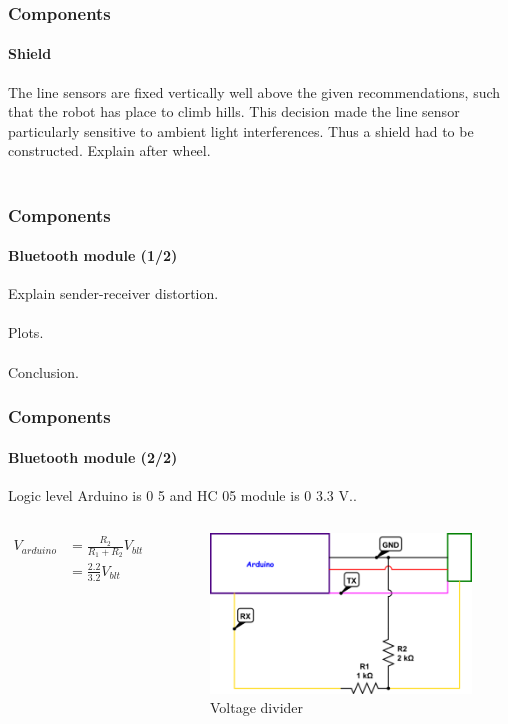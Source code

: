 \documentclass{beamer}
\begin{document}

\begin{frame}
\frametitle{Components}
\framesubtitle{Shield}
The line sensors are fixed vertically well above the given recommendations, such that the robot has place to climb hills. This decision made the line sensor 
particularly sensitive to ambient light interferences. Thus a shield had to be constructed. Explain after wheel. \\~\\
\end{frame}


\begin{frame}
\frametitle{Components}
\framesubtitle{Bluetooth module (1/2)}
Explain sender-receiver distortion.\\~\\
Plots.\\~\\
Conclusion.
\end{frame}


\begin{frame}
\frametitle{Components}
\framesubtitle{Bluetooth module (2/2)}
Logic level Arduino is 0 5 and HC 05 module is 0 3.3 V..
\begin{columns}[c]

\begin{align*} 
V_{arduino} &=  \frac{R_2}{R_1+R_2}V_{blt} \\[0.4cm]
 &=  \frac{2.2}{3.2}V_{blt}
\end{align*}

\begin{figure}[hbtp]
\centering
\includegraphics[scale=0.5]{figures/voltage-divider.png}
\caption{Voltage divider}
\end{figure}

\end{columns}
\end{frame}
\end{document}

